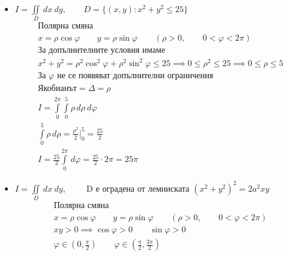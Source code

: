\documentclass[a4paper,fleqn,12pt]{article}
\theoremstyle{definition}
\begin{document}
\begin{itemize}
\item $I = \iint\limits_D \, dx \ dy, \qquad
 D = \{ (x,y) : x^2 +y^2 \leq 25 \}$ 
\begin{gather*}
\text{Полярна смяна} \\
x = \rho \cos \varphi \qquad y = \rho \sin \varphi \qquad (\rho > 0, \qquad 0< \varphi < 2\pi ) \\
\text{За допълнителните условия имаме} \\
x^2 + y^2  = \rho^2 \cos^2 \varphi +\rho^2 \sin^2 \varphi \leq 25 \implies 
0 \leq \rho^2 \leq 25 \implies
 0 \leq \rho \leq 5 \\
\text{За $\varphi$ не се появяват допълнителни ограничения} \\
\text{Якобианът} = \Delta = \rho \\
I = \int\limits_0 ^{2\pi} \int\limits_0 ^5 \rho \, d\rho \ d\varphi\\
\int\limits_0 ^5 \rho \, d \rho = 
\frac{\rho^2}{2} \Big|_0 ^5 = \frac{25}{2} \\
I = \frac{25}{2} \int\limits_0 ^{2\pi} \, d\varphi = 
\frac{25}{2} \cdot 2\pi = 25\pi 
\end{gather*}

\item $I = \iint\limits_D \, dx \ dy, \qquad$ 
D е оградена от лемниската $(x^2 + y^2)^2 = 2a^2 xy$ 
\begin{gather*}
\text{Полярна смяна} \\
x = \rho \cos \varphi \qquad y = \rho \sin \varphi \qquad (\rho > 0, \qquad 0< \varphi < 2\pi ) \\
xy>0 \implies \cos \varphi > 0 \qquad \sin \varphi > 0 \\
\varphi \in \left(0, \frac{\pi}{2} \right) \qquad  \varphi \in \left(\frac{\pi}{2}, \frac{3\pi}{2} \right)
\end{gather*}


\end{itemize}
\end{document}
